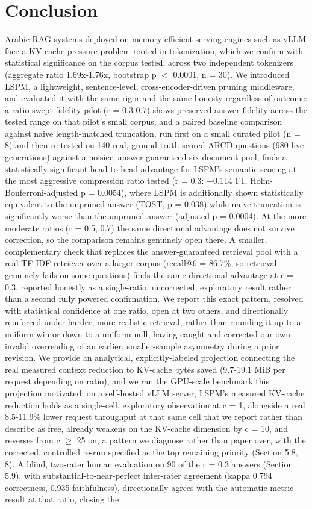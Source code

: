 \section{Conclusion}
Arabic RAG systems deployed on memory-efficient serving engines such as vLLM face a KV-cache pressure problem rooted in tokenization, which we confirm with statistical significance on the corpus tested, across two independent tokenizers (aggregate ratio 1.69x-1.76x, bootstrap p $<$ 0.0001, n = 30). We introduced LSPM, a lightweight, sentence-level, cross-encoder-driven pruning middleware, and evaluated it with the same rigor and the same honesty regardless of outcome: a ratio-swept fidelity pilot (r = 0.3-0.7) shows preserved answer fidelity across the tested range on that pilot's small corpus, and a paired baseline comparison against naive length-matched truncation, run first on a small curated pilot (n = 8) and then re-tested on 140 real, ground-truth-scored ARCD questions (980 live generations) against a noisier, answer-guaranteed six-document pool, finds a statistically significant head-to-head advantage for LSPM's semantic scoring at the most aggressive compression ratio tested (r = 0.3: +0.114 F1, Holm-Bonferroni-adjusted p = 0.0054), where LSPM is additionally shown statistically equivalent to the unpruned answer (TOST, p = 0.038) while naive truncation is significantly worse than the unpruned answer (adjusted p = 0.0004). At the more moderate ratios (r = 0.5, 0.7) the same directional advantage does not survive correction, so the comparison remains genuinely open there. A smaller, complementary check that replaces the answer-guaranteed retrieval pool with a real TF-IDF retriever over a larger corpus (recall@6 = 86.7\%, so retrieval genuinely fails on some questions) finds the same directional advantage at r = 0.3, reported honestly as a single-ratio, uncorrected, exploratory result rather than a second fully powered confirmation. We report this exact pattern, resolved with statistical confidence at one ratio, open at two others, and directionally reinforced under harder, more realistic retrieval, rather than rounding it up to a uniform win or down to a uniform null, having caught and corrected our own invalid overreading of an earlier, smaller-sample asymmetry during a prior revision. We provide an analytical, explicitly-labeled projection connecting the real measured context reduction to KV-cache bytes saved (9.7-19.1 MiB per request depending on ratio), and we ran the GPU-scale benchmark this projection motivated: on a self-hosted vLLM server, LSPM's measured KV-cache reduction holds as a single-cell, exploratory observation at c = 1, alongside a real 8.5-11.9\% lower request throughput at that same cell that we report rather than describe as free, already weakens on the KV-cache dimension by c = 10, and reverses from c $\geq$ 25 on, a pattern we diagnose rather than paper over, with the corrected, controlled re-run specified as the top remaining priority (Section 5.8, 8). A blind, two-rater human evaluation on 90 of the r = 0.3 answers (Section 5.9), with substantial-to-near-perfect inter-rater agreement (kappa 0.794 correctness, 0.935 faithfulness), directionally agrees with the automatic-metric result at that ratio, closing the 